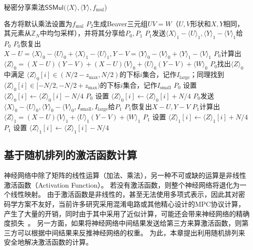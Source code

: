 \begin{algorithm}[h!]
\caption{秘密分享乘法{$\mathsf{SSMul}(\langle X \rangle, \langle Y \rangle, f_\text{mul}$)}}
\label{alg:ss-perm:ss-mul}
    \begin{algorithmic}[1]
    \State 各方将默认乘法设置为$f_\text{mul}$ 
    \State $P_2$生成Beaver三元组$UV=W$（$U, V$形状和$X, Y$相同，其元素从$\mathbb Z_N$中均匀采样），并将其分享给$P_0, P_1$
    \State $P_1$发送$\langle X \rangle_1 - \langle U \rangle_1, \langle Y \rangle_1 - \langle V \rangle_1$给$P_0$
    \State $P_0$恢复出
    $X - U = \langle X \rangle_0 - \langle U \rangle_0 + \langle X \rangle_1 - \langle U \rangle_1, 
     Y - V = \langle Y \rangle_0 - \langle V \rangle_0 + \langle Y \rangle_1 - \langle V \rangle_1$
     \State $P_0$计算出$\langle Z \rangle_0 = (X - U)(Y - V) + (X - U)\langle V \rangle_0 + \langle U \rangle_0 (Y - V) + \langle W \rangle_0$
    \State $P_0$找出$\langle Z \rangle_0$中满足 $\langle Z \rangle_0[i] \in (N/2 - z_\text{max}, N/2)$的下标$i$集合，记作$I_\text{large}$；同理找到$\langle Z \rangle_0[i] \in [-N/2, -N/2 + z_\text{max})$的下标$i$集合，记作$I_\text{small}$
        \State $P_0$ 设置 $\langle Z \rangle_0[i] \gets \langle Z \rangle_0[i] - N/4$
    \EndFor
        \State $P_0$ 设置 $\langle Z \rangle_0[i] \gets \langle Z \rangle_0[i] + N/4$
    \EndFor
    \State $P_0$发送$\langle X \rangle_0 - \langle U \rangle_0, \langle Y \rangle_0 - \langle V \rangle_0, I_\text{small}, I_\text{large}$给$P_1$
    \State $P_1$恢复出$X - U, Y - V$
    \State $P_1$计算出$\langle Z \rangle_1 = (X - U)\langle V \rangle_1 + \langle U \rangle_1(Y - V) + \langle W \rangle_1$
        \State $P_1$ 设置 $\langle Z \rangle_1[i] \gets \langle Z \rangle_1[i] + N/4$
    \EndFor
        \State $P_1$ 设置 $\langle Z \rangle_1[i] \gets \langle Z \rangle_1[i] - N/4$
    \EndFor
    \end{algorithmic}
\end{algorithm}




\subsection{基于随机排列的激活函数计算}
神经网络中除了矩阵的线性运算（加法、乘法），另一种不可或缺的运算是非线性激活函数（Activation Function）。
%
若没有激活函数，则整个神经网络将退化为一个线性映射。
%
由于激活函数是非线性的，甚至无法使用多项式表示，因此其对密码学方案不友好，当前许多研究采用混淆电路或其他精心设计的MPC协议计算，产生了大量的开销，同时由于其中采用了近似计算，可能还会带来神经网络的精确度损失~\cite{}。
%
另一方面，如果将神经网络中间结果发送给第三方来算激活函数，则第三方可以根据中间结果来反推神经网络的权重。
%
为此，本章提出利用随机排列来安全地解决激活函数的计算。



